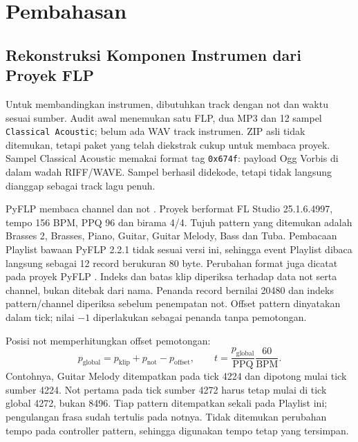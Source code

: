 \section{Pembahasan}
\subsection{Rekonstruksi Komponen Instrumen dari Proyek FLP}
Untuk membandingkan instrumen, dibutuhkan track dengan not dan waktu
sesuai sumber. Audit awal menemukan satu FLP, dua MP3 dan 12 sampel
\texttt{Classical Acoustic}; belum ada WAV track instrumen. ZIP asli
tidak ditemukan, tetapi paket yang telah diekstrak cukup untuk membaca
proyek. Sampel Classical Acoustic memakai format tag \texttt{0x674f}:
payload Ogg Vorbis di dalam wadah RIFF/WAVE. Sampel berhasil didekode,
tetapi tidak langsung dianggap sebagai track lagu penuh.

PyFLP membaca channel dan not \cite{pyflp}. Proyek berformat FL Studio
25.1.6.4997, tempo 156 BPM, PPQ 96 dan birama 4/4. Tujuh pattern yang
ditemukan adalah Brasses 2, Brasses, Piano, Guitar, Guitar Melody,
Bass dan Tuba. Pembacaan Playlist bawaan PyFLP 2.2.1 tidak sesuai
versi ini, sehingga event Playlist dibaca langsung sebagai 12 record
berukuran 80 byte. Perubahan format juga dicatat pada proyek PyFLP
\cite{playlist}. Indeks dan batas klip diperiksa terhadap data not
serta channel, bukan ditebak dari nama.
Penanda record bernilai 20480 dan indeks pattern/channel diperiksa
sebelum penempatan not. Offset pattern dinyatakan dalam tick;
nilai $-1$ diperlakukan sebagai penanda tanpa pemotongan.

Posisi not memperhitungkan offset pemotongan:
\begin{equation}
 p_{\mathrm{global}}=p_{\mathrm{klip}}+p_{\mathrm{not}}-p_{\mathrm{offset}},
 \qquad t=\frac{p_{\mathrm{global}}}{\mathrm{PPQ}}\frac{60}{\mathrm{BPM}}.
 \label{eq:timing}
\end{equation}
Contohnya, Guitar Melody ditempatkan pada tick 4224 dan dipotong mulai
tick sumber 4224. Not pertama pada tick sumber 4272 harus tetap mulai
di tick global 4272, bukan 8496. Tiap pattern ditempatkan sekali pada
Playlist ini; pengulangan frasa sudah tertulis pada notnya. Tidak
ditemukan perubahan tempo pada controller pattern, sehingga digunakan
tempo tetap yang tersimpan.

